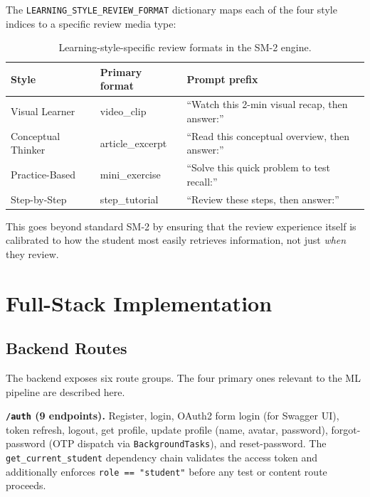 \documentclass[12pt,a4paper]{article}
\begin{document}
The \texttt{LEARNING\_STYLE\_REVIEW\_FORMAT} dictionary maps each
of the four style indices to a specific review media type:

\begin{table}[H]
  \centering
  \caption{Learning-style-specific review formats in the SM-2 engine.}
  \begin{tabular}{lll}
    \toprule
    \textbf{Style} & \textbf{Primary format} & \textbf{Prompt prefix} \\
    \midrule
    Visual Learner     & video\_clip       & ``Watch this 2-min visual recap, then answer:'' \\
    Conceptual Thinker & article\_excerpt  & ``Read this conceptual overview, then answer:'' \\
    Practice-Based     & mini\_exercise    & ``Solve this quick problem to test recall:'' \\
    Step-by-Step       & step\_tutorial    & ``Review these steps, then answer:'' \\
    \bottomrule
  \end{tabular}
\end{table}

This goes beyond standard SM-2 by ensuring that the review
experience itself is calibrated to how the student most easily
retrieves information, not just \emph{when} they review.

\section{Full-Stack Implementation}

\subsection{Backend Routes}

The backend exposes six route groups. The four primary ones
relevant to the ML pipeline are described here.

\noindent\textbf{\texttt{/auth} (9 endpoints).}
Register, login, OAuth2 form login (for Swagger UI), token refresh,
logout, get profile, update profile (name, avatar, password),
forgot-password (OTP dispatch via \texttt{BackgroundTasks}), and
reset-password. The \texttt{get\_current\_student} dependency chain
validates the access token and additionally enforces
\texttt{role == "student"} before any test or content route proceeds.
\end{document}
